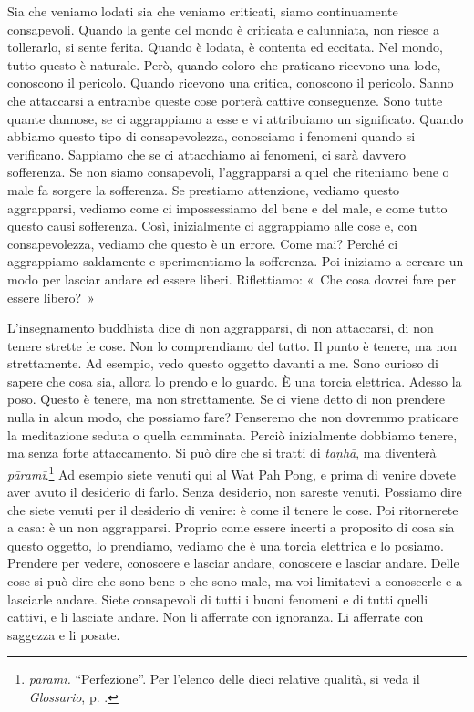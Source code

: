 Sia che veniamo lodati sia che veniamo criticati, siamo continuamente
consapevoli. Quando la gente del mondo è criticata e calunniata, non
riesce a tollerarlo, si sente ferita. Quando è lodata, è contenta ed
eccitata. Nel mondo, tutto questo è naturale. Però, quando coloro che
praticano ricevono una lode, conoscono il pericolo. Quando ricevono una
critica, conoscono il pericolo. Sanno che attaccarsi a entrambe queste
cose porterà cattive conseguenze. Sono tutte quante dannose, se ci
aggrappiamo a esse e vi attribuiamo un significato. Quando abbiamo
questo tipo di consapevolezza, conosciamo i fenomeni quando si
verificano. Sappiamo che se ci attacchiamo ai fenomeni, ci sarà davvero
sofferenza. Se non siamo consapevoli, l'aggrapparsi a quel che
riteniamo bene o male fa sorgere la sofferenza. Se prestiamo attenzione,
vediamo questo aggrapparsi, vediamo come ci impossessiamo del bene e del
male, e come tutto questo causi sofferenza. Così, inizialmente ci
aggrappiamo alle cose e, con consapevolezza, vediamo che questo è un
errore. Come mai? Perché ci aggrappiamo saldamente e sperimentiamo la
sofferenza. Poi iniziamo a cercare un modo per lasciar andare ed essere
liberi. Riflettiamo: «~Che cosa dovrei fare per essere libero?~»

L'insegnamento buddhista dice di non aggrapparsi, di non attaccarsi, di
non tenere strette le cose. Non lo comprendiamo del tutto. Il punto è
tenere, ma non strettamente. Ad esempio, vedo questo oggetto davanti a
me. Sono curioso di sapere che cosa sia, allora lo prendo e lo guardo. È
una torcia elettrica. Adesso la poso. Questo è tenere, ma non
strettamente. Se ci viene detto di non prendere nulla in alcun modo, che
possiamo fare? Penseremo che non dovremmo praticare la meditazione
seduta o quella camminata. Perciò inizialmente dobbiamo tenere, ma
senza forte attaccamento. Si può dire che si tratti di \emph{taṇhā}, ma
diventerà \emph{pāramī}.\footnote{\emph{pāramī.} ``Perfezione''. Per
  l'elenco delle dieci relative qualità, si veda il \emph{Glossario}, p. \pageref{glossary-parami}.}
Ad esempio siete venuti qui al Wat Pah Pong, e prima di venire dovete
aver avuto il desiderio di farlo. Senza desiderio, non sareste venuti.
Possiamo dire che siete venuti per il desiderio di venire: è come il
tenere le cose. Poi ritornerete a casa: è un non aggrapparsi. Proprio
come essere incerti a proposito di cosa sia questo oggetto, lo
prendiamo, vediamo che è una torcia elettrica e lo posiamo. Prendere per
vedere, conoscere e lasciar andare, conoscere e lasciar andare. Delle
cose si può dire che sono bene o che sono male, ma voi limitatevi a
conoscerle e a lasciarle andare. Siete consapevoli di tutti i buoni
fenomeni e di tutti quelli cattivi, e li lasciate andare. Non li
afferrate con ignoranza. Li afferrate con saggezza e li posate.

